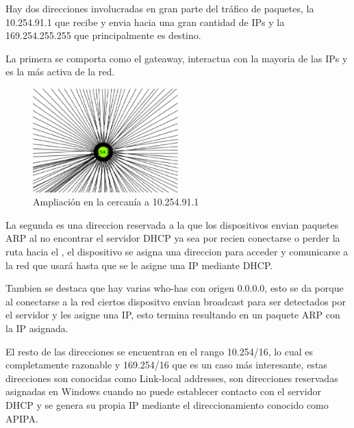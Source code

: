 	\par Hay dos direcciones involucradas en gran parte del tráfico de paquetes, la 10.254.91.1 que  recibe y envia hacia una gran cantidad de IPs y la 169.254.255.255 que principalmente es destino.

	\par La primera se comporta como el gateaway, interactua con la mayoria de las IPs y es la más activa de la red.  


\begin{figure}[H]
		\centering
		\includegraphics[width=0.5\textwidth]{img/graph/escenario_3/10254.eps}
		\caption{Ampliación en la cercan\'ia a 10.254.91.1}
		\label{fig:grafo_escenario3}
	\end{figure}


	\par La segunda es una direccion reservada  a la que los dispositivos envian paquetes ARP al no encontrar el servidor DHCP ya sea por recien conectarse o perder la ruta hacia el , el dispositivo se asigna una direccion para acceder y comunicarse a la red que usará hasta que se le asigne una IP mediante DHCP. 


	\par Tambien se destaca que hay varias who-has con origen 0.0.0.0, esto se da porque al conectarse a la red ciertos dispositvo envian broadcast para ser detectados por el servidor y les asigne una IP, esto termina resultando en un paquete ARP con la IP asignada.


	\par El resto de las direcciones se encuentran en el rango 10.254/16, lo cual es completamente razonable y 169.254/16 que es un caso más interesante, estas direcciones son conocidas como Link-local addresses, son direcciones reservadas asignadas en Windows cuando no puede establecer contacto con el servidor DHCP y se genera su propia IP mediante el direccionamiento conocido como APIPA.

